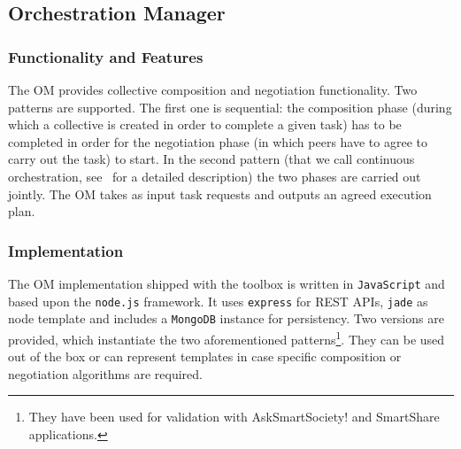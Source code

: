 \subsection{Orchestration Manager}
\subsubsection{Functionality and Features}
The OM provides collective composition and negotiation functionality. Two patterns are supported. The first one is sequential: the composition phase (during which a collective is created in order to complete a given task) has to be completed in order for the negotiation phase (in which peers have to agree to carry out the task) to start. In the second pattern (that we call continuous orchestration, see~\cite{D6.2} for a detailed description) the two phases are carried out jointly. The OM takes as input task requests and outputs an agreed execution plan. 
\subsubsection{Implementation}
The OM implementation shipped with the toolbox is written in {\tt JavaScript} and based upon the {\tt node.js} framework. It uses {\tt express} for REST APIs, {\tt jade} as node template and includes a {\tt MongoDB} instance for persistency. Two versions are provided, which instantiate the two aforementioned patterns\footnote{They have been used for validation with AskSmartSociety! and SmartShare applications.}. 
They can be used out of the box or can represent templates in case specific composition or negotiation algorithms are required. %
